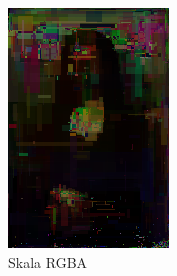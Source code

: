 \begin{figure}[!htb]
    \centering
    \begin{subfigure}[b]{0.3\textwidth}
        \centering
        \label{fig:scale_1_rgba}
         \includegraphics[width=\textwidth]{images/mona/10000_300_2/img_0_it_10000_best.png}
         \caption{Skala RGBA}
    \end{subfigure}
    \begin{subfigure}[b]{0.3\textwidth}
        \centering
        \label{fig:scale_1_bw}

\end{subfigure}
\end{figure}
